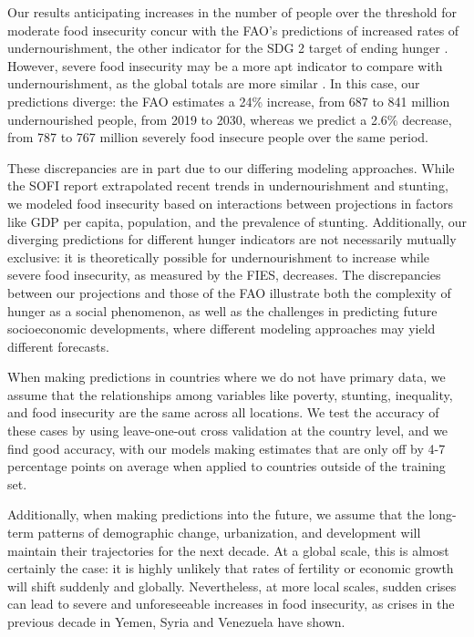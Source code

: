 \documentclass{article}
\begin{document}
Our results anticipating increases in the number of people over the threshold for moderate food insecurity concur with the FAO's predictions of increased rates of undernourishment, the other indicator for the SDG 2 target of ending hunger \citep[Part 1, Page 11]{sofi2020}.  However, severe food insecurity may be a more apt indicator to compare with undernourishment, as the global totals are more similar \citep{sofi2020}.  In this case, our predictions diverge: the FAO estimates a 24\% increase, from 687 to 841 million undernourished people, from 2019 to 2030, whereas we predict a 2.6\% decrease, from 787 to 767 million severely food insecure people over the same period.

These discrepancies are in part due to our differing modeling approaches. While the SOFI report extrapolated recent trends in undernourishment and stunting, we modeled food insecurity based on interactions between projections in factors like GDP per capita, population, and the prevalence of stunting. Additionally, our diverging predictions for different hunger indicators are not necessarily mutually exclusive: it is theoretically possible for undernourishment to increase while severe food insecurity, as measured by the FIES, decreases.  The discrepancies between our projections and those of the FAO illustrate both the complexity of hunger as a social phenomenon, as well as the challenges in predicting future socioeconomic developments, where different modeling approaches may yield different forecasts.

When making predictions in countries where we do not have primary data, we assume that the relationships among variables like poverty, stunting, inequality, and food insecurity are the same across all locations.  We test the accuracy of these cases by using leave-one-out cross validation at the country level, and we find good accuracy, with our models making estimates that are only off by 4-7 percentage points on average when applied to countries outside of the training set. 

Additionally, when making predictions into the future, we assume that the long-term patterns of demographic change, urbanization, and development will maintain their trajectories for the next decade.  At a global scale, this is almost certainly the case: it is highly unlikely that rates of fertility or economic growth will shift suddenly and globally.  Nevertheless, at more local scales, sudden crises can lead to severe and unforeseeable increases in food insecurity, as crises in the previous decade in Yemen, Syria and Venezuela have shown.
\end{document}
